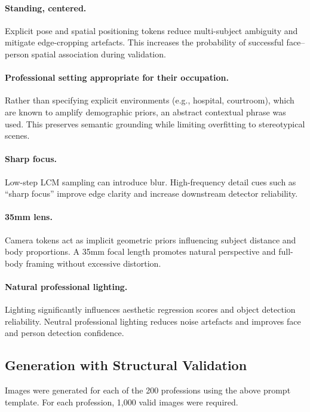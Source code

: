 \paragraph{Standing, centered.}
Explicit pose and spatial positioning tokens reduce multi-subject ambiguity and mitigate edge-cropping artefacts. This increases the probability of successful face–person spatial association during validation.

\paragraph{Professional setting appropriate for their occupation.}
Rather than specifying explicit environments (e.g., hospital, courtroom), which are known to amplify demographic priors, an abstract contextual phrase was used. This preserves semantic grounding while limiting overfitting to stereotypical scenes.

\paragraph{Sharp focus.}
Low-step LCM sampling can introduce blur. High-frequency detail cues such as ``sharp focus'' improve edge clarity and increase downstream detector reliability.

\paragraph{35mm lens.}
Camera tokens act as implicit geometric priors influencing subject distance and body proportions. A 35mm focal length promotes natural perspective and full-body framing without excessive distortion.

\paragraph{Natural professional lighting.}
Lighting significantly influences aesthetic regression scores and object detection reliability. Neutral professional lighting reduces noise artefacts and improves face and person detection confidence.

\subsection{Generation with Structural Validation}

Images were generated for each of the 200 professions using the above prompt template. For each profession, 1,000 valid images were required.

